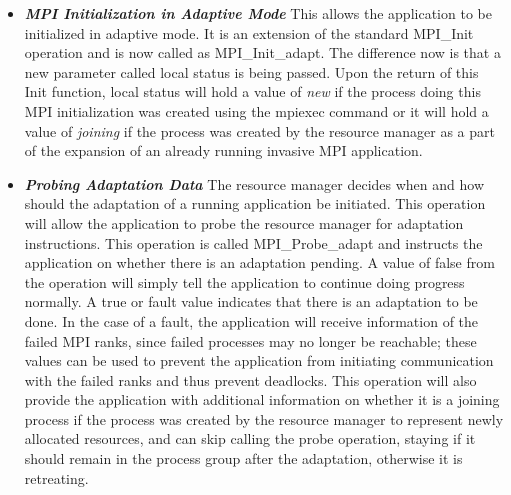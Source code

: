 \begin{itemize}
\item \textbf{\textit{MPI Initialization in Adaptive Mode}} This allows the application to be initialized in adaptive mode. It is an extension of the standard MPI{\_}Init operation and is now called as MPI{\_}Init{\_}adapt. The difference now is that a new parameter called local status is being passed. Upon the return of this Init function, local status will hold a value of \textit{new} if the process doing this MPI initialization was created using the mpiexec command or it will hold a value of \textit{joining} if the process was created by the resource manager as a part of the expansion of an already running invasive MPI application.
\item \textbf{\textit{Probing Adaptation Data}} The resource manager decides when and how should the adaptation of a running application be initiated. This operation will allow the application to probe the resource manager for adaptation instructions. This operation is called MPI{\_}Probe{\_}adapt and instructs the application on whether there is an adaptation pending. A value of false from the operation will simply tell the application to continue doing progress normally. A true or fault value indicates that there is an adaptation to be done. In the case of a fault, the application will receive information of the failed MPI ranks, since failed processes may no longer be reachable; these values can be used to prevent the application from initiating communication with the failed  ranks and thus prevent deadlocks. This operation will also provide the application with additional information on whether it is a joining process if the process was created by the resource manager to represent newly allocated resources, and can skip calling the probe operation, staying if it should remain in the process group after the adaptation, otherwise it is retreating. 

\end{itemize}
